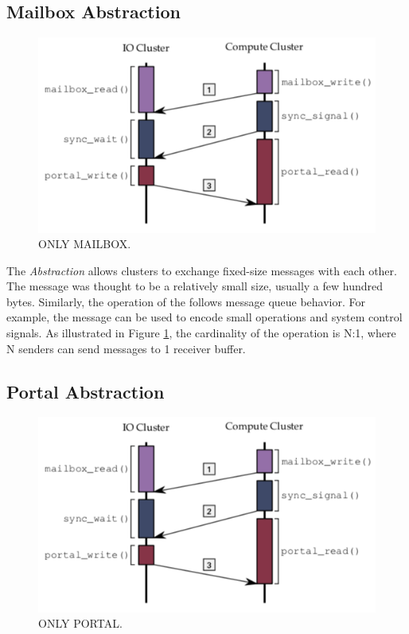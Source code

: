 		\subsection{Mailbox Abstraction}
		\label{sec.mailbox-abs}

			\begin{figure}[h]
				\centering
				\includegraphics[width=.7\textwidth]{images/conceptual-sync.png}

				\caption{
					ONLY MAILBOX.
				}\par
				\label{fig.conpt_mailbox}
			\end{figure}

			The \textit{\mailbox Abstraction} allows clusters to exchange fixed-size
			messages with each other.
			The message was thought to be a relatively small size, usually a few hundred bytes.
			Similarly, the operation of the \mailbox follows \posix message queue behavior.
			For example, the message can be used to encode small operations and system
			control signals.
			As illustrated in Figure \ref{fig.conpt_mailbox}, the cardinality of the operation
			is N:1, where N senders can send messages to 1 receiver buffer.

		\subsection{Portal Abstraction}
		\label{sec.portal-abs}

			\begin{figure}[h]
				\centering
				\includegraphics[width=.7\textwidth]{images/conceptual-sync.png}

				\caption{
					ONLY PORTAL.
				}\par
				\label{fig.conpt_portal}
			\end{figure}

